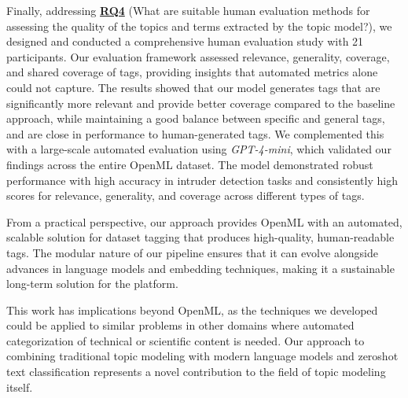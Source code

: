 Finally, addressing \hyperref[rq4]{\textbf{RQ4}} (What are suitable human evaluation methods for assessing the quality of the topics and terms extracted by the topic model?), we designed and conducted a comprehensive human evaluation study with 21 participants. Our evaluation framework assessed relevance, generality, coverage, and shared coverage of tags, providing insights that automated metrics alone could not capture. The results showed that our model generates tags that are significantly more relevant and provide better coverage compared to the baseline approach, while maintaining a good balance between specific and general tags, and are close in performance to human-generated tags. We complemented this with a large-scale automated evaluation using \textit{GPT-4-mini}, which validated our findings across the entire OpenML dataset. The model demonstrated robust performance with high accuracy in intruder detection tasks and consistently high scores for relevance, generality, and coverage across different types of tags.

From a practical perspective, our approach provides OpenML with an automated, scalable solution for dataset tagging that produces high-quality, human-readable tags. The modular nature of our pipeline ensures that it can evolve alongside advances in language models and embedding techniques, making it a sustainable long-term solution for the platform.

This work has implications beyond OpenML, as the techniques we developed could be applied to similar problems in other domains where automated categorization of technical or scientific content is needed. Our approach to combining traditional topic modeling with modern language models and zeroshot text classification represents a novel contribution to the field of topic modeling itself.